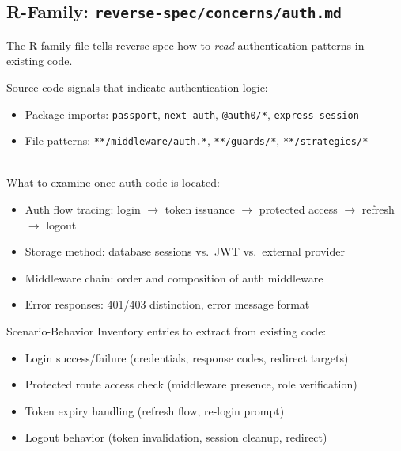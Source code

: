 \documentclass[11pt,a4paper,openright,twoside]{report}
\newcommand{\file}[1]{\texttt{#1}}
\begin{document}
\subsection{R-Family: \file{reverse-spec/concerns/auth.md}}

The R-family file tells reverse-spec how to \emph{read} authentication patterns in existing code.

\begin{description}[style=nextline, leftmargin=1.8cm, labelwidth=1.4cm]
  \item[R1 --- Code Pattern Keywords]
  Source code signals that indicate authentication logic:
  \begin{itemize}[nosep]
    \item Package imports: \texttt{passport}, \texttt{next-auth}, \texttt{@auth0/*}, \texttt{express-session}
    \item File patterns: \texttt{**/middleware/auth.*}, \texttt{**/guards/*}, \texttt{**/strategies/*}
  \end{itemize}

  \item[R2 --- Analysis Dimensions] \hfill \\
  What to examine once auth code is located:
  \begin{itemize}[nosep]
    \item Auth flow tracing: login $\to$ token issuance $\to$ protected access $\to$ refresh $\to$ logout
    \item Storage method: database sessions vs.\ JWT vs.\ external provider
    \item Middleware chain: order and composition of auth middleware
    \item Error responses: 401/403 distinction, error message format
  \end{itemize}

  \item[R4 --- SBI Extraction]
  Scenario-Behavior Inventory entries to extract from existing code:
  \begin{itemize}[nosep]
    \item Login success/failure (credentials, response codes, redirect targets)
    \item Protected route access check (middleware presence, role verification)
    \item Token expiry handling (refresh flow, re-login prompt)
    \item Logout behavior (token invalidation, session cleanup, redirect)
  \end{itemize}
\end{description}
\end{document}
